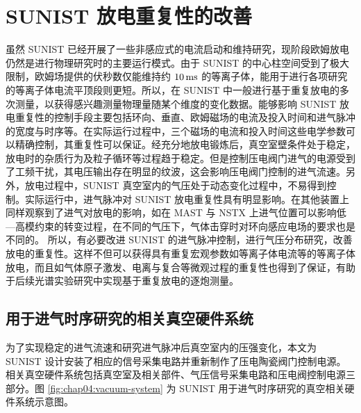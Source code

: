 \graphicspath{{figures/appendix-gaspuffing/}}

\section{SUNIST 放电重复性的改善}


虽然 SUNIST 已经开展了一些非感应式的电流启动和维持研究\cite{TanYi:HJBYDLZTWL:ECW,TanYi2008:Thesis}，现阶段欧姆放电仍然是进行物理研究时的主要运行模式。由于 SUNIST 的中心柱空间受到了极大限制，欧姆场提供的伏秒数仅能维持约 $10\,{\rm ms}$ 的等离子体，能用于进行各项研究的等离子体电流平顶段则更短。所以，在 SUNIST 中一般进行基于重复放电的多次测量，以获得感兴趣测量物理量随某个维度的变化数据\cite{WangWH2005:PPCF:Edge,HeYexi2006:PST:startup,XieHQ:2011:ISTW}。能够影响 SUNIST 放电重复性的控制手段主要包括环向、垂直、欧姆磁场的电流及投入时间和进气脉冲的宽度与时序等。在实际运行过程中，三个磁场的电流和投入时间这些电学参数可以精确控制，其重复性可以保证。经充分地放电锻炼后，真空室壁条件处于稳定，放电时的杂质行为及粒子循环等过程\cite{Belyakov2003:InpurityToPlasma:TRANSMAK}趋于稳定。但是控制压电阀门进气的电源受到了工频干扰，其电压输出存在明显的纹波，这会影响压电阀门控制的进气流速。另外，放电过程中，SUNIST 真空室内的气压处于动态变化过程中，不易得到控制。实际运行中，进气脉冲对 SUNIST 放电重复性具有明显影响\cite{TanYi2011:NF:ECR,HeYexi2006:PST:startup}。在其他装置上同样观察到了进气对放电的影响，如在 MAST\cite{Carolan:2002:MASTgaspufftoLHmode} 与 NSTX\cite{Maingi2004:PPCF:NSTXgaspufftoLHmode} 上进气位置可以影响低---高模约束的转变过程，在不同的气压下，气体击穿时对环向感应电场的要求也是不同的\cite{Chattopa1996:SINP:breakdown,Antonio2001:TCABR:breakdown}。 所以，有必要改进 SUNIST 的进气脉冲控制，进行气压分布研究，改善放电的重复性。这样不但可以获得具有重复宏观参数\pozhehao 如等离子体电流等\pozhehao 的等离子体放电，而且如气体原子激发、电离与复合等微观过程的重复性也得到了保证，有助于后续光谱实验研究中实现基于重复放电的逐炮测量。

\subsection{用于进气时序研究的相关真空硬件系统}
\label{subsec:vv-related-parts}

为了实现稳定的进气流速和研究进气脉冲后真空室内的压强变化，本文为 SUNIST 设计安装了相应的信号采集电路并重新制作了压电陶瓷阀门控制电源。相关真空硬件系统包括真空室及相关部件、气压信号采集电路和压电阀控制电源三部分。图 \ref{fig:chap04:vacuum-system} 为 SUNIST 用于进气时序研究的真空相关硬件系统示意图。

